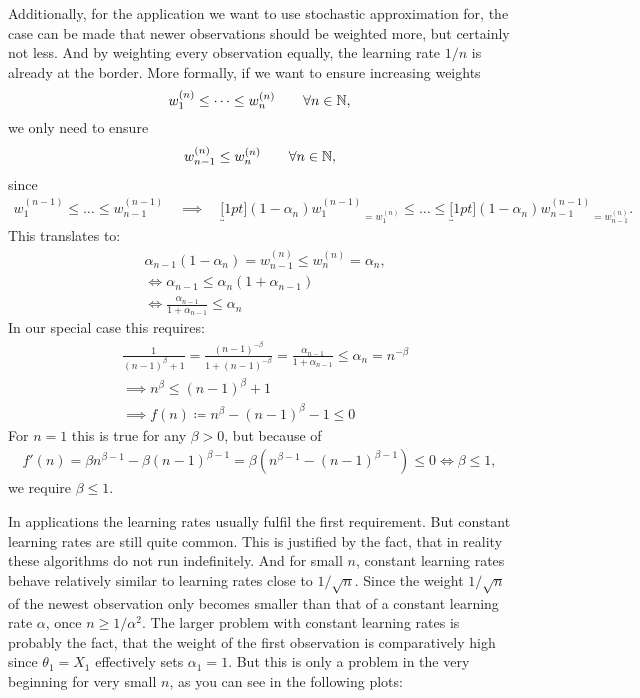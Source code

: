 Additionally, for the application we want to use stochastic approximation for, the case can be made that newer observations should be weighted more, but certainly not less. And by weighting every observation equally, the learning rate \(1/n\) is already at the border. More formally, if we want to ensure increasing weights
\[
    w_1^{(n)} \le \dots \le w_n^{(n)}  \qquad \forall n\in\mathbb{N},
\]
we only need to ensure
\[
    w_{n-1}^{(n)} \le w_n^{(n)} \qquad \forall n\in\mathbb{N},
\]
since
\begin{align*}
    w_1^{(n-1)} \le \dots \le w_{n-1}^{(n-1)}
    \quad \implies\quad
    \underbracket[1pt]{(1-\alpha_n) w_1^{(n-1)}}_{=w_1^{(n)}} 
    \le \dots \le 
    \underbracket[1pt]{(1-\alpha_n) w_{n-1}^{(n-1)}}_{=w_{n-1}^{(n)}}.
\end{align*}
This translates to:
\begin{align*}
    &\alpha_{n-1}(1-\alpha_n) = w_{n-1}^{(n)} \le w_n^{(n)} = \alpha_n,\\
    &\iff \alpha_{n-1}\le \alpha_n(1+\alpha_{n-1})\\
    &\iff \frac{\alpha_{n-1}}{1+\alpha_{n-1}}\le \alpha_n
\end{align*}
In our special case this requires:
\begin{align*}
    &\frac{1}{(n-1)^\beta+1}=\frac{(n-1)^{-\beta}}{1+(n-1)^{-\beta}}= \frac{\alpha_{n-1}}{1+\alpha_{n-1}}\le \alpha_n= n^{-\beta}\\
    &\implies n^\beta \le (n-1)^\beta +1\\
    &\implies f(n)\coloneqq n^\beta -(n-1)^\beta -1\le 0
\end{align*}
For \(n=1\) this is true for any \(\beta>0\), but because of
\begin{align*}
    f'(n)= \beta n^{\beta-1} -\beta(n-1)^{\beta-1}=\beta(n^{\beta-1}-(n-1)^{\beta-1})\le 0 \iff \beta\le 1,
\end{align*}
we require \(\beta\le 1\).

In applications the learning rates usually fulfil the first requirement. But constant learning rates are still quite common. This is justified by the fact, that in reality these algorithms do not run indefinitely. And for small \(n\), constant learning rates behave relatively similar to learning rates close to \(1/\sqrt{n}\). Since the weight \(1/\sqrt{n}\) of the newest observation only becomes smaller than that of a constant learning rate \(\alpha\), once \(n\ge1/\alpha^2 \). The larger problem with constant learning rates is probably the fact, that the weight of the first observation is comparatively high since \(\theta_1=X_1\) effectively sets \(\alpha_1=1\). But this is only a problem in the very beginning for very small \(n\), as you can see in the following plots:

